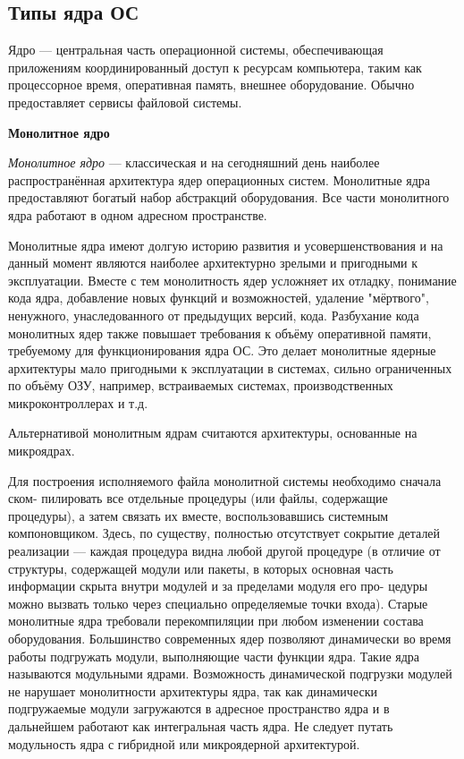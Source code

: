 \subsection{Типы ядра ОС}
\begin{opr}
   Ядро — центральная часть операционной системы, обеспечивающая приложениям координированный доступ к ресурсам компьютера, таким как процессорное время, оперативная память, внешнее оборудование. Обычно предоставляет сервисы файловой системы.
\end{opr}
\textbf{Монолитное ядро}

\textit{Монолитное ядро} — классическая и на сегодняшний день наиболее распространённая архитектура ядер операционных систем. Монолитные ядра предоставляют богатый набор абстракций оборудования. Все части монолитного ядра работают в одном адресном пространстве.

Монолитные ядра имеют долгую историю развития и усовершенствования и на данный момент являются наиболее архитектурно зрелыми и пригодными к эксплуатации. Вместе с тем монолитность ядер усложняет их отладку, понимание кода ядра, добавление новых функций и возможностей, удаление "мёртвого", ненужного, унаследованного от предыдущих версий, кода. Разбухание кода монолитных ядер также повышает требования к объёму оперативной памяти, требуемому для функционирования ядра ОС. Это делает монолитные ядерные архитектуры мало пригодными к эксплуатации в системах, сильно ограниченных по объёму ОЗУ, например, встраиваемых системах, производственных микроконтроллерах и т.д.

Альтернативой монолитным ядрам считаются архитектуры, основанные на микроядрах.

Для построения исполняемого файла монолитной системы необходимо сначала ском-
пилировать все отдельные процедуры (или файлы, содержащие процедуры), а затем
связать их вместе, воспользовавшись системным компоновщиком. Здесь, по существу,
полностью отсутствует сокрытие деталей реализации — каждая процедура видна любой
другой процедуре (в отличие от структуры, содержащей модули или пакеты, в которых
основная часть информации скрыта внутри модулей и за пределами модуля его про-
цедуры можно вызвать только через специально определяемые точки входа).
Старые монолитные ядра требовали перекомпиляции при любом изменении состава оборудования. Большинство современных ядер позволяют динамически во время работы подгружать модули, выполняющие части функции ядра. Такие ядра называются модульными ядрами. Возможность динамической подгрузки модулей не нарушает монолитности архитектуры ядра, так как динамически подгружаемые модули загружаются в адресное пространство ядра и в дальнейшем работают как интегральная часть ядра. Не следует путать модульность ядра с гибридной или микроядерной архитектурой.

